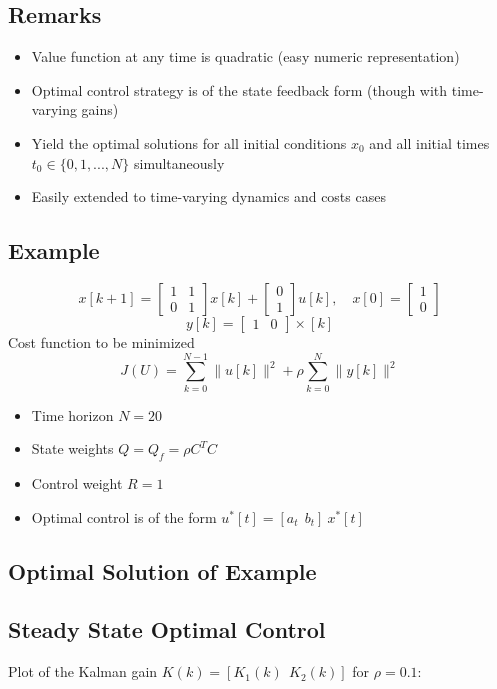\documentclass[10pt,a4paper,oneside]{article}
\begin{document}
\subsection{Remarks}
\begin{itemize}
\item Value function at any time is quadratic (easy numeric representation)
\item Optimal control strategy is of the state feedback form (though with time-varying gains)
\item Yield the optimal solutions for all initial conditions $x_0$ and all initial times $t_0\in\{0,1,...,N\}$ simultaneously
\item Easily extended to time-varying dynamics and costs cases
\end{itemize}
\subsection{Example}
$$
x[k+1]=\left[\begin{array}{ll}{1} & {1} \\ {0} & {1}\end{array}\right] x[k]+\left[\begin{array}{l}{0} \\ {1}\end{array}\right] u[k], \quad x[0]=\left[\begin{array}{l}{1} \\ {0}\end{array}\right]
$$
$$
y[k]=\left[\begin{array}{ll}{1} & {0}\end{array}\right] \times[k]
$$
Cost function to be minimized
$$
J(U)=\sum_{k=0}^{N-1}\|u[k]\|^{2}+\rho \sum_{k=0}^{N}\|y[k]\|^{2}
$$
\begin{itemize}
\item Time horizon $N=20$
\item State weights $Q=Q_f=\rho C^TC$
\item Control weight $R=1$
\item Optimal control is of the form $u^*[t]=[a_t\ \ b_t]\ x^*[t]$ 
\end{itemize}
\subsection{Optimal Solution of Example}
\subsection{Steady State Optimal Control}
Plot of the Kalman gain $K(k)=[K_1(k)\ \ K_2(k)]$ for $\rho=0.1$:
\end{document}
